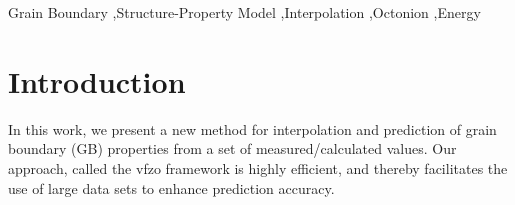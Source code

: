 \documentclass[final,twocolumn,12pt]{elsarticle}
\begin{document}
\begin{frontmatter}
\glsresetall

\begin{keyword}
Grain Boundary \sep Structure-Property Model \sep Interpolation \sep Octonion \sep Energy
\end{keyword}


\end{frontmatter}

\section{Introduction} \label{sec:intro}

In this work, we present a new method for interpolation and prediction of grain boundary (GB) properties from a set of measured/calculated values. Our approach, called the \gls{vfzo} framework is highly efficient, and thereby facilitates the use of large data sets to enhance prediction accuracy.
\end{document}
